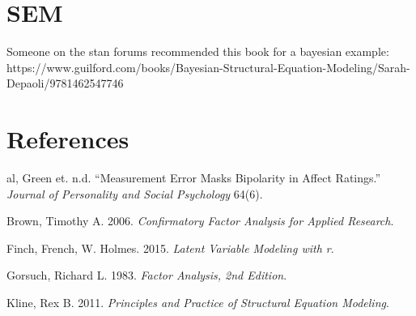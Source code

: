 \documentclass[
  letterpaper,
  DIV=11,
  numbers=noendperiod]{scrreprt}
\newlength{\cslhangindent}
\newlength{\cslentryspacingunit} %
\newenvironment{CSLReferences}[2] %
 {%
  \setlength{\parindent}{0pt}
  \ifodd #1
  \let\oldpar\par
  \def\par{\hangindent=\cslhangindent\oldpar}
  \fi
  \setlength{\parskip}{#2\cslentryspacingunit}
 }%
 {}
\begin{document}

\hypertarget{sem}{%
\chapter{SEM}\label{sem}}

Someone on the stan forums recommended this book for a bayesian example:
https://www.guilford.com/books/Bayesian-Structural-Equation-Modeling/Sarah-Depaoli/9781462547746


\hypertarget{references}{%
\chapter*{References}\label{references}}


\hypertarget{refs}{}
\begin{CSLReferences}{1}{0}
\leavevmode{}%
al, Green et. n.d. {``Measurement Error Masks Bipolarity in Affect
Ratings.''} \emph{Journal of Personality and Social Psychology} 64(6).

\leavevmode{}%
Brown, Timothy A. 2006. \emph{Confirmatory Factor Analysis for Applied
Research}.

\leavevmode{}%
Finch, French, W. Holmes. 2015. \emph{Latent Variable Modeling with r}.

\leavevmode{}%
Gorsuch, Richard L. 1983. \emph{Factor Analysis, 2nd Edition}.

\leavevmode{}%
Kline, Rex B. 2011. \emph{Principles and Practice of Structural Equation
Modeling}.

\end{CSLReferences}
\end{document}
